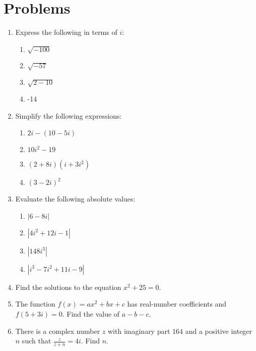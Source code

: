\documentclass[12pt]{extarticle}
\begin{document}
\section{Problems}
\begin{enumerate}
    \itemsep 2.0em
    \item {Express the following in terms of $i$:
        \begin{enumerate}
            \itemsep 1.0em
            \item {$\sqrt{-100}$} %
            \item {$\sqrt{-57}$} %
            \item {$\sqrt{2-10}$} %
            \item {-14} %
        \end{enumerate}
    }
    \item {Simplify the following expressions:
        \begin{enumerate}
            \itemsep 1.0em
            \item {$2i - (10 - 5i)$} %
            \item {$10i^2 - 19$} %
            \item {$(2+8i)(i+3i^2)$} %
            \item {$(3-2i)^2$} %
        \end{enumerate}
    }
    \item {Evaluate the following absolute values:
        \begin{enumerate}
            \itemsep 1.0em
            \item {$|6-8i|$} %
            \item {$|4i^2+12i-1|$} %
            \item {$|148i^3|$} %
            \item {$|i^3-7i^2+11i-9|$} %
        \end{enumerate}
    }
    \item {Find the solutions to the equation $x^2 + 25 = 0$.} %
    \item {The function $f(x) = ax^2+bx+c$ has real-number coefficients and $f(5+3i) = 0$. Find the value of $a-b-c$.} %
    \item {There is a complex number $z$ with imaginary part $164$ and a positive integer $n$ such that $\frac{z}{z + n} = 4i$. Find $n$.} %
\end{enumerate}
\end{document}
